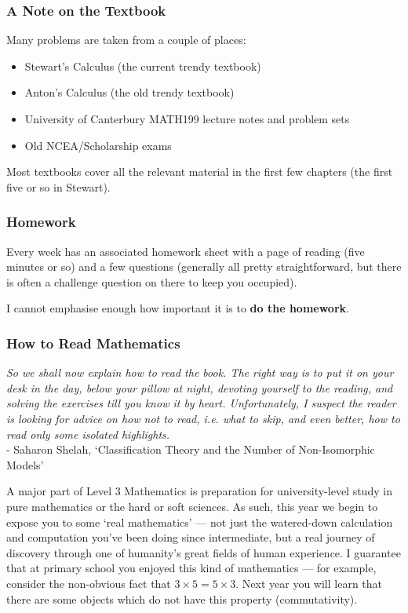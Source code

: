 \subsubsection*{A Note on the Textbook}
Many problems are taken from a couple of places:
\begin{itemize}
  \item Stewart's Calculus (the current trendy textbook)
  \item Anton's Calculus (the old trendy textbook)
  \item University of Canterbury MATH199 lecture notes and problem sets
  \item Old NCEA/Scholarship exams
\end{itemize}
Most textbooks cover all the relevant material in the first few chapters (the first five or so in Stewart).

\subsubsection*{Homework}
Every week has an associated homework sheet with a page of reading (five minutes or so) and a few questions (generally all
pretty straightforward, but there is often a challenge question on there to keep you occupied).

I cannot emphasise enough how important it is to \textbf{do the homework}.

\subsubsection*{How to Read Mathematics}
\begin{center}
  \textit{So we shall now explain how to read the book. The right way is to put it on your desk in the day, below your pillow at night, devoting yourself to the reading, and solving the exercises till you know it by heart. Unfortunately, I suspect the reader is looking for advice on how not to read, i.e. what to skip, and even better, how to read only some isolated highlights.}\\ - Saharon Shelah, `Classification Theory and the Number of Non-Isomorphic Models'
\end{center}

A major part of Level 3 Mathematics is preparation for university-level study in pure mathematics or the hard or soft sciences. As such, this
year we begin to expose you to some `real mathematics' --- not just the watered-down calculation and computation you've been doing since intermediate,
but a real journey of discovery through one of humanity's great fields of human experience. I guarantee that at primary school you enjoyed
this kind of mathematics --- for example, consider the non-obvious fact that $ 3 \times 5 = 5 \times 3 $. Next year you will learn that there are
some objects which do not have this property (commutativity).

